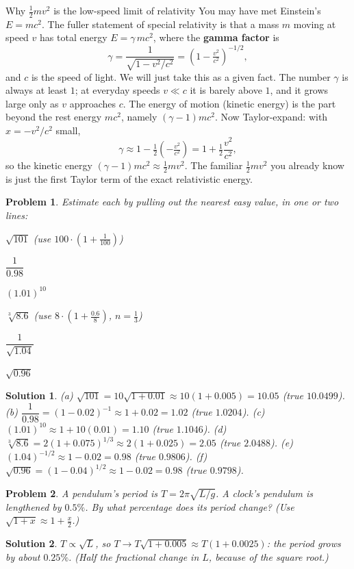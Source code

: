\documentclass[11pt]{article}
\newcommand{\clearpts}{\addtocounter{tpts}{\value{cpts}} \setcounter{cpts}{0}}
\newcommand{\pts}[1]{\clearpts \setcounter{cpts}{#1}}
\newtheorem*{solution}{Solution}
\theoremstyle{mystyle}
\newtheorem{pproblem}{Problem}
\begin{document}
\begin{psexample}{Why $\tfrac12 mv^2$ is the low-speed limit of relativity}{}
You may have met Einstein's $E = mc^2$. The fuller statement of special relativity is
that a mass $m$ moving at speed $v$ has total energy $E = \gamma\, mc^2$, where the
\textbf{gamma factor} is
\[
\gamma = \frac{1}{\sqrt{1 - v^2/c^2}} = \left(1 - \tfrac{v^2}{c^2}\right)^{-1/2},
\]
and $c$ is the speed of light. We will just take this as a given fact. The number
$\gamma$ is always at least $1$; at everyday speeds $v \ll c$ it is barely above $1$, and
it grows large only as $v$ approaches $c$. The energy of motion (kinetic energy) is the
part beyond the rest energy $mc^2$, namely $(\gamma - 1)mc^2$. Now Taylor-expand: with
$x = -v^2/c^2$ small,
\[
\gamma \approx 1 - \tfrac12\!\left(-\tfrac{v^2}{c^2}\right) = 1 + \tfrac12\frac{v^2}{c^2},
\]
so the kinetic energy $(\gamma - 1)mc^2 \approx \tfrac12 m v^2$. The familiar
$\tfrac12 mv^2$ you already know is just the first Taylor term of the exact relativistic
energy.
\end{psexample}

\pts{6}
\begin{pproblem}
Estimate each by pulling out the nearest easy value, in one or two lines:
\begin{subpart}
\item $\sqrt{101}$ \quad (use $100\cdot(1+\tfrac{1}{100})$)
\item $\dfrac{1}{0.98}$
\item $(1.01)^{10}$
\item $\sqrt[3]{8.6}$ \quad (use $8\cdot(1+\tfrac{0.6}{8})$, $n = \tfrac13$)
\item $\dfrac{1}{\sqrt{1.04}}$
\item $\sqrt{0.96}$
\end{subpart}
\end{pproblem}
\begin{solution}
(a) $\sqrt{101} = 10\sqrt{1+0.01}\approx 10(1+0.005) = 10.05$ (true $10.0499$).\quad
(b) $\dfrac{1}{0.98} = (1-0.02)^{-1}\approx 1+0.02 = 1.02$ (true $1.0204$).\quad
(c) $(1.01)^{10}\approx 1+10(0.01) = 1.10$ (true $1.1046$).\quad
(d) $\sqrt[3]{8.6} = 2(1+0.075)^{1/3}\approx 2(1+0.025) = 2.05$ (true $2.0488$).\quad
(e) $(1.04)^{-1/2}\approx 1-0.02 = 0.98$ (true $0.9806$).\quad
(f) $\sqrt{0.96} = (1-0.04)^{1/2}\approx 1-0.02 = 0.98$ (true $0.9798$).
\end{solution}

\pts{3}
\begin{pproblem}
A pendulum's period is $T = 2\pi\sqrt{L/g}$. A clock's pendulum is lengthened by
$0.5\%$. By what percentage does its period change? (Use $\sqrt{1+x}\approx 1+\tfrac{x}{2}$.)
\end{pproblem}
\begin{solution}
$T \propto \sqrt{L}$, so $T \to T\sqrt{1+0.005}\approx T(1+0.0025)$: the period grows by
about $0.25\%$. (Half the fractional change in $L$, because of the square root.)
\end{solution}
\end{document}
